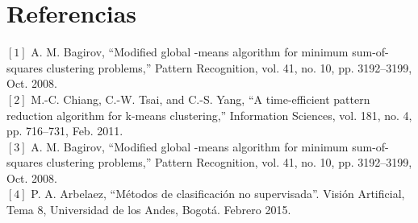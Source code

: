 \documentclass[10pt,twocolumn,letterpaper]{article}
\begin{document}
\section{Referencias}

$[1]$
A. M. Bagirov, “Modified global -means algorithm for minimum sum-of-squares clustering problems,” Pattern Recognition, vol. 41, no. 10, pp. 3192–3199, Oct. 2008.\\

\vspace{0.15 cm}
$[2]$
M.-C. Chiang, C.-W. Tsai, and C.-S. Yang, “A time-efficient pattern reduction algorithm for k-means clustering,” Information Sciences, vol. 181, no. 4, pp. 716–731, Feb. 2011.\\

\vspace{0.15 cm}
$[3]$
A. M. Bagirov, “Modified global -means algorithm for minimum sum-of-squares clustering problems,” Pattern Recognition, vol. 41, no. 10, pp. 3192–3199, Oct. 2008.\\

\vspace{0.15 cm}
$[4]$
P. A. Arbelaez, “Métodos de clasificación no supervisada”. Visión Artificial, Tema 8, Universidad de los Andes, Bogotá. Febrero 2015.\\
\end{document}

